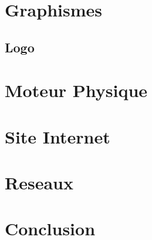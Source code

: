 \documentclass [11pt]{report}
\begin{document}
\chapter {Graphismes}
	\section {Logo}
 
\chapter {Moteur Physique}

\chapter {Site Internet}

\chapter {Reseaux}

\chapter {Conclusion}
\end{document}
